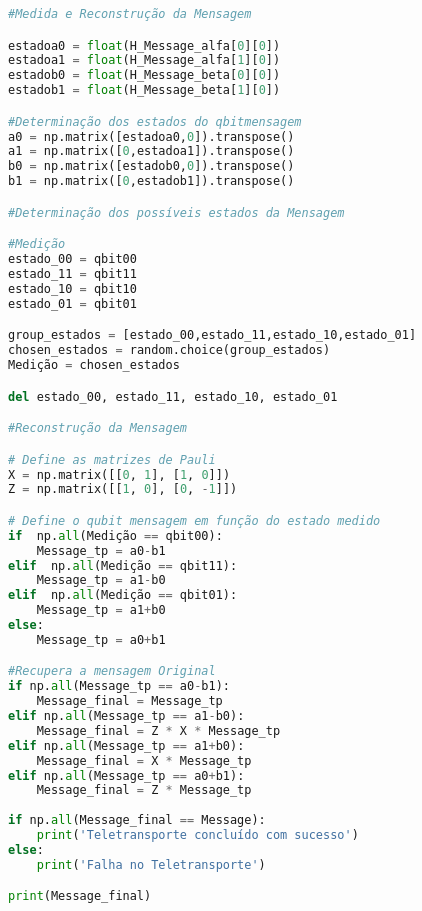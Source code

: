 \begin{lstlisting}[language=Python, caption=Protocolo de Teletransporte]
#Medida e Reconstrução da Mensagem

estadoa0 = float(H_Message_alfa[0][0])
estadoa1 = float(H_Message_alfa[1][0])
estadob0 = float(H_Message_beta[0][0])
estadob1 = float(H_Message_beta[1][0])

#Determinação dos estados do qbitmensagem
a0 = np.matrix([estadoa0,0]).transpose()
a1 = np.matrix([0,estadoa1]).transpose()
b0 = np.matrix([estadob0,0]).transpose()
b1 = np.matrix([0,estadob1]).transpose()

#Determinação dos possíveis estados da Mensagem

#Medição
estado_00 = qbit00
estado_11 = qbit11
estado_10 = qbit10
estado_01 = qbit01

group_estados = [estado_00,estado_11,estado_10,estado_01]
chosen_estados = random.choice(group_estados)
Medição = chosen_estados

del estado_00, estado_11, estado_10, estado_01

#Reconstrução da Mensagem

# Define as matrizes de Pauli
X = np.matrix([[0, 1], [1, 0]])
Z = np.matrix([[1, 0], [0, -1]])

# Define o qubit mensagem em função do estado medido
if  np.all(Medição == qbit00):
    Message_tp = a0-b1
elif  np.all(Medição == qbit11):
    Message_tp = a1-b0
elif  np.all(Medição == qbit01):
    Message_tp = a1+b0
else:
    Message_tp = a0+b1

#Recupera a mensagem Original
if np.all(Message_tp == a0-b1):
    Message_final = Message_tp
elif np.all(Message_tp == a1-b0):
    Message_final = Z * X * Message_tp  
elif np.all(Message_tp == a1+b0):
    Message_final = X * Message_tp 
elif np.all(Message_tp == a0+b1):
    Message_final = Z * Message_tp 
    
if np.all(Message_final == Message):
    print('Teletransporte concluído com sucesso')
else:
    print('Falha no Teletransporte')

print(Message_final)  

\end{lstlisting}